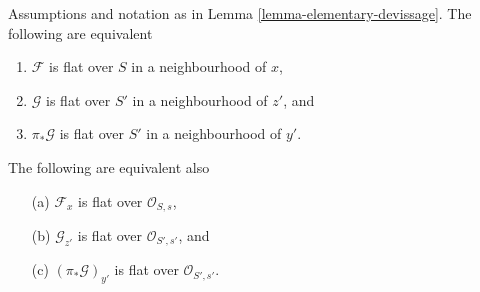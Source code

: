 \begin{lemma}
\label{lemma-devissage-flat}
Assumptions and notation as in
Lemma \ref{lemma-elementary-devissage}.
The following are equivalent
\begin{enumerate}
\item $\mathcal{F}$ is flat over $S$ in a neighbourhood of $x$,
\item $\mathcal{G}$ is flat over $S'$ in a neighbourhood of $z'$, and
\item $\pi_*\mathcal{G}$ is flat over $S'$ in a neighbourhood of $y'$.
\end{enumerate}
The following are equivalent also
\begin{enumerate}
\item[(a)] $\mathcal{F}_x$ is flat over $\mathcal{O}_{S, s}$,
\item[(b)] $\mathcal{G}_{z'}$ is flat over $\mathcal{O}_{S', s'}$, and
\item[(c)] $(\pi_*\mathcal{G})_{y'}$ is flat over $\mathcal{O}_{S', s'}$.
\end{enumerate}
\end{lemma}

